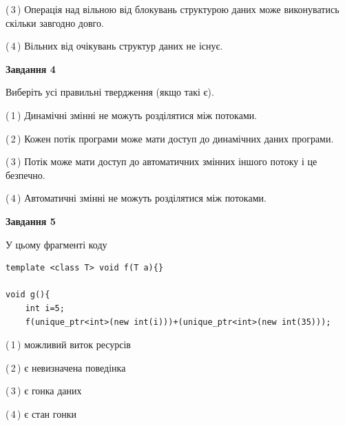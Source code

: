 \documentclass[12pt, ukrainian]{article}
\begin{document}
\begin {large}
{(\,3\,) Операція над вільною від блокувань структурою даних може виконуватись скільки завгодно довго.%

(\,4\,) Вільних від очікувань структур даних не існує.%



\begin{center}
\textbf{Завдання 4}
\end{center}
Виберіть усі правильні твердження (якщо такі є).\par
\vspace{2mm}

(\,1\,) Динамічні змінні не можуть розділятися між потоками.%

(\,2\,) Кожен потік програми може мати доступ до динамічних даних програми.%

(\,3\,) Потік може мати доступ до автоматичних змінних іншого потоку і це безпечно.%

(\,4\,) Автоматичні змінні не можуть розділятися між потоками.%



\begin{center}
\textbf{Завдання 5}
\end{center}
У цьому фрагменті коду
\begin{verbatim}
template <class T> void f(T a){}

void g(){
    int i=5;
    f(unique_ptr<int>(new int(i)))+(unique_ptr<int>(new int(35)));
\end{verbatim}
(\,1\,) можливий виток ресурсів%

(\,2\,) є невизначена поведінка%

(\,3\,) є гонка даних%

(\,4\,) є стан гонки%


}
\end {large}
\end{document}
